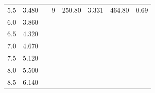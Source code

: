 \documentclass[a4paper,12pt]{article}
\begin{document}
\begin{table}[h]
{\begin{tabular}{|r|r|rcrrrr}
5.5                    & 3.480                  & \multicolumn{1}{r|}{}                   & \multicolumn{1}{r|}{9}                      & \multicolumn{1}{r|}{250.80}                  & \multicolumn{1}{r|}{3.331}                  & \multicolumn{1}{r|}{464.80}                  & \multicolumn{1}{r|}{0.69}                \\ \cline{1-2} \cline{4-8} 
6.0                    & 3.860                  & \multicolumn{1}{r}{}                   & \multicolumn{5}{c}{\multirow{}{}{}}                                                                                                                                                                                              \\ \cline{1-2}
6.5                    & 4.320                  & \multicolumn{1}{r}{}                   & \multicolumn{5}{c}{}                                                                                                                                                                                                               \\ \cline{1-2}
7.0                    & 4.670                  & \multicolumn{1}{r}{}                   & \multicolumn{5}{c}{}                                                                                                                                                                                                               \\ \cline{1-2}
7.5                    & 5.120                  & \multicolumn{1}{r}{}                   & \multicolumn{5}{c}{}                                                                                                                                                                                                               \\ \cline{1-2}
8.0                    & 5.500                  & \multicolumn{1}{r}{}                   & \multicolumn{5}{c}{}                                                                                                                                                                                                               \\ \cline{1-2}
8.5                    & 6.140                  & \multicolumn{1}{r}{}                   & \multicolumn{5}{c}{}                                                                                                                                                                                                               \\ \cline{1-2}

\end{tabular}}
\end{table}
\end{document}
